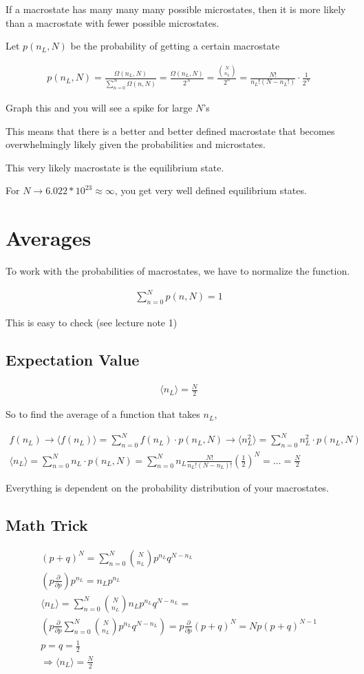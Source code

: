 \documentclass[fleqn]{report}
\newcommand{\del}{\partial}
\newcommand{\equations} [1] {
\begin{gather*}
#1
\end{gather*}
}
\begin{document}
If a macrostate has many many many possible microstates, then it is more likely 
than a macrostate with fewer possible microstates. 

Let $p(n_L, N)$ be the probability of getting a certain macrostate
\equations{
    p(n_L, N)
    =
    \frac{\Omega(n_L, N)}{\sum^N_{n = 0} \Omega(n, N)}
    =
    \frac{\Omega(n_L, N)}{2^N}
    =
    \frac{{N \choose n_L}}{2^n}
    =
    \frac{N!}{n_L! (N - n_L!)} \cdot \frac{1}{2^N}
}
Graph this and you will see a spike for large $N$'s 

This means that there is a better and better defined macrostate that becomes 
overwhelmingly likely given the probabilities and microstates. 

This very likely macrostate is the equilibrium state.

For $N \to 6.022 * 10^{23} \approx \infty$, you get very well defined equilibrium 
states.

\section{Averages}
To work with the probabilities of macrostates, we have to normalize the function. 

\equations{
    \sum^N_{n = 0} p(n, N) = 1
}
This is easy to check (see lecture note 1)

\subsection{Expectation Value}
\equations{
    \langle n_L \rangle 
    =
    \frac{N}{2}
}

So to find the average of a function that takes $n_L$, 
\equations{
    f(n_L)
    \rightarrow 
    \langle f(n_L) \rangle 
    =
    \sum^N_{n = 0} 
    f(n_L) \cdot p(n_L, N)
    \rightarrow 
    \langle n_L^2 \rangle 
    =
    \sum^N_{n = 0} 
    n_L^2 \cdot p(n_L, N)
    \\
    \langle n_L \rangle 
    =
    \sum^N_{n = 0} 
    n_L \cdot p(n_L, N)
    =
    \sum^N_{n = 0} 
    n_L
    \frac{N!}{n_L! (N - n_L)!} (\frac{1}{2})^N
    = \ldots =
    \frac{N}{2}
}

Everything is dependent on the probability distribution of your macrostates.

\subsection{Math Trick}
\equations{
    (p + q)^N = 
    \sum^N_{n = 0}
    {N \choose n_L} p^{n_L} q^{N - n_L}
    \\
    (p \frac{\del}{\del p}) p^{n_L}
    =
    n_L p^{n_L}
    \\
    \langle n_L \rangle
    =
    \sum^N_{n = 0}
    {N \choose n_L}
    n_L p^{n_L} q^{N - n_L}
    =
    \\
    \left(
        p \frac{\del}{\del p}
        \sum^N_{n = 0}
        {N \choose n_L}
        p^{n_L} q^{N - n_L}
    \right)
    =
    p \frac{\del }{\del p}
    (p + q)^N
    =
    N p (p + q)^{N - 1}
    \\
    p = q = \frac{1}{2}
    \\
    \Rightarrow 
    \langle n_L \rangle 
    =
    \frac{N}{2}
}
\end{document}
